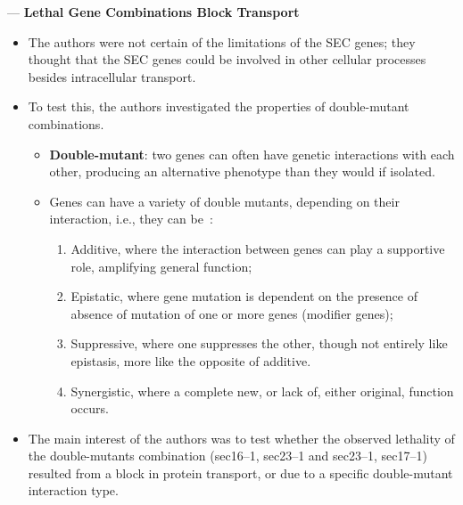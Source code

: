 \documentclass[basic,plain]{inVerba-notes}
\begin{document}
 --- \textbf{Lethal Gene Combinations Block Transport}
\begin{itemize}
  \item The authors were not certain of the limitations of the SEC genes; they thought that the SEC genes could be involved in other cellular processes besides intracellular transport. 
  \item To test this, the authors investigated the properties of double-mutant combinations.
    \begin{itemize}
      \item \textbf{Double-mutant}: two genes can often have genetic interactions with each other, producing an alternative phenotype than they would if isolated.
      \item Genes can have a variety of double mutants, depending on their interaction, i.e., they can be~\cite{perez2009understanding}:
        \begin{enumerate}
          \item Additive, where the interaction between genes can play a supportive role, amplifying general function; 
          \item Epistatic, where gene mutation is dependent on the presence of absence of mutation of one or more genes (modifier genes); 
          \item Suppressive, where one suppresses the other, though not entirely like epistasis, more like the opposite of additive.
          \item Synergistic, where a complete new, or lack of, either original, function occurs.
        \end{enumerate}
    \end{itemize}
    \item The main interest of the authors was to test whether the observed lethality of the double-mutants combination (sec16--1, sec23--1 and sec23--1, sec17--1) resulted from a block in protein transport, or due to a specific double-mutant interaction type.
\end{itemize}

\medskip
\end{document}

